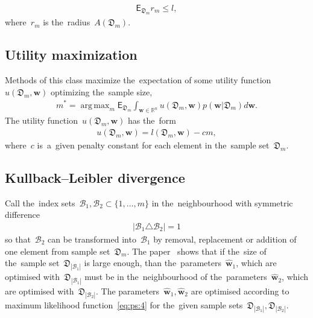 \documentclass[
11pt,%
tightenlines,%
twoside,%
onecolumn,%
nofloats,%
nobibnotes,%
nofootinbib,%
superscriptaddress,%
noshowpacs,%
centertags]%
{revtex4}
\DeclareMathOperator*{\argmax}{arg\,max}
\begin{document}
\[
\label{eq:bs:5}
\begin{aligned}
    \mathsf{E}_{\mathfrak{D}_m}r_m\leq l,
\end{aligned}
\]
where~$r_m$ is the~radius~$A\left(\mathfrak{D}_{m}\right)$.

\subsection{Utility maximization}
Methods of this class maximize the~expectation of some utility function~$u\left(\mathfrak{D}_{m}, \mathbf{w}\right)$ optimizing the~sample size,
\[
\label{eq:bs:6}
\begin{aligned}
    m^* = \argmax_{m} \mathsf{E}_{\mathfrak{D}_m}\int_{\mathbf{w}\in\mathbb{R}^{n}}u\left(\mathfrak{D}_m, \mathbf{w}\right)p(\mathbf{w}|\mathfrak{D}_m)d\mathbf{w}.
\end{aligned}
\]
The utility function~$u\left(\mathfrak{D}_{m}, \mathbf{w}\right)$ has the~form
\[
\label{eq:bs:7}
\begin{aligned}
    u\left(\mathfrak{D}_m, \mathbf{w}\right) = l\left(\mathfrak{D}_m, \mathbf{w}\right) - cm,
\end{aligned}
\]
 where~$c$ is~a~given penalty constant for each element in the~sample set~$\mathfrak{D}_m$.

\subsection{Kullback--Leibler divergence}
Call the~index sets~$\mathcal{B}_1,\mathcal{B}_2  \subset
\{1,\dots,m\}$ in the~neighbourhood with symmetric difference
\[
\label{eq:bs:8}
\begin{aligned}
    \left|\mathcal{B}_1 \triangle \mathcal{B}_2\right| = 1
\end{aligned}
\]
so that~$\mathcal{B}_2$ can be transformed into~$\mathcal{B}_1$ by
removal,  replacement or addition of one element from sample
set~$\mathfrak{D}_m$. The paper~\cite{motrenko2014} shows that if
the~size of the~sample set~$\mathfrak{D}_{|\mathcal{B}_1|}$ is large
enough, than the~parameters~$\hat{\mathbf{w}}_1$, which are
optimised with~$\mathfrak{D}_{|\mathcal{B}_1|}$ must be in
the~neighbourhood of the~parameters~$\hat{\mathbf{w}}_2$, which are
optimised with~$\mathfrak{D}_{|\mathcal{B}_2|}$. The
parameters~$\hat{\mathbf{w}}_1, \hat{\mathbf{w}}_2$ are optimised
according to maximum likelihood function~\eqref{eq:ps:4} for
the~given sample sets~$\mathfrak{D}_{|\mathcal{B}_1|},
\mathfrak{D}_{|\mathcal{B}_2|}$.
\end{document}
